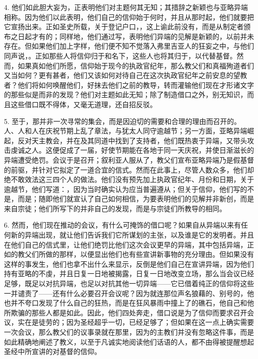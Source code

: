 4. 他们如此胆大妄为，正表明他们对主题何其无知；其措辞之新颖也与亚略异端相称。因为他们以此表明，他们自己的信仰始于何时，并且从那时起，他们就要把它宣扬出来。正如圣史所载，关于登记户口，，这上谕此前没有，而是从制定者颁布之日起才有的；同样地，他们通过写，表明他们异端的见解是新颖的，以前并未存在。但如果他们加上字样，他们便不知不觉落入弗里吉亚人的狂妄之中，与他们同声说，。正如那些人将信仰归于和名下，这些人也将其归于，以代替基督。然而，如果真如他们所愿，信仰始于现今的执政官纪年，那么教父们和真福殉道者们又当如何？更有甚者，他们又该如何对待自己在这次执政官纪年之前安息的望教者？他们将如何唤醒他们，好抹去他们之前的教导，转而灌输他们现在才形诸文字的那些似是而非的发现？他们对主题如此无知；除了制造借口之外，别无知识，而且这些借口既不得体，又毫无道理，还自招反驳。\par

5. 至于，那并非一次寻常的集会，而是因迫切的需要和合理的理由而召开的。人、人和人在庆祝节期上乱了章法，与犹太人同守逾越节；另一方面，亚略异端崛起，反对天主教会，并在及其同道中找到了支持者，他们既热衷于异端，又带头攻击虔诚之人。这便促成了一届，好使节期能在各地于同一天庆祝，并使日渐滋长的异端遭受绝罚。会议于是召开；叙利亚人服从了，教父们宣布亚略异端乃是假基督的前驱，并针对它拟定了一道合宜的信式。然而在此事上，尽管人数众多，他们却绝不敢效法这三四个人的做法。他们没有预先加上执政官纪年、月份和日期，关于逾越节，他们写道：，因为当时确实认为应当普遍遵从；但关于信仰，他们写的不是，而是；随即他们就宣认了自己如何相信，为要表明他们的见解并非新创，而是来自宗徒；他们所写下的并非自己的发现，而是与宗徒们所教导的相同。\par

6. 然而，他们现在推动的会议，有什么可掩饰的借口呢？如果自从异端以来有任何新的异端出现，就让他们告诉我们它所谋划的主张，以及谁是它的发明者。并且在他们自己的信式里，让他们绝罚比他们这次会议更早的异端，其中包括异端，正如的教父们所做的那样，以便显出他们也有些宣讲新事物的充分理由。但如果没有这样的事发生，他们也拿不出什么来显示，反倒是他们自己在宣讲异端，因为他们持有亚略的不虔，并且日复一日地被揭露，日复一日地改变立场，那么当会议已经足够，既足以对抗异端，也足以对抗其他一切异端——它已借着纯正的信仰将这些一并谴责了——还有什么必要召开会议呢？因为就连那位声名狼藉的、别号的，他也并不夸口发现了什么自己的狂热，而是在狂风暴雨中撞上了的礁石，他自己和他所欺骗的那些人都是如此。因此，他们四处奔走，借口说是为了信仰而要求召开会议，实在是徒劳的；因为圣经超乎一切，已经足够了；但如果在这一点上确实需要一次会议，那么教父们的议事录就在那里，因为的主教们并没有忽略这件事，而是如此精确地阐述了教义，以至于凡诚实地阅读他们话语的人，都不由得被提醒想起圣经中所宣讲的对基督的信仰。\par


